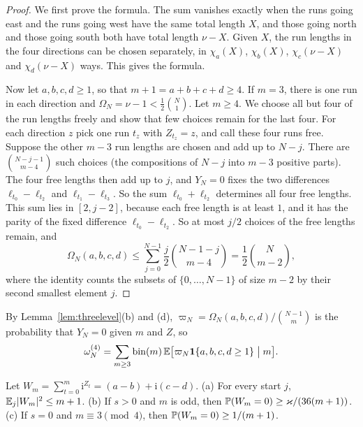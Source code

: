 \begin{proof}
We first prove the formula. The sum vanishes exactly when the runs going east and the runs going
west have the same total length $X$, and those going north and those going south both have total
length $\nu-X$. Given $X$, the run lengths in the four directions can be chosen separately, in
$\chi_a(X)$, $\chi_b(X)$, $\chi_c(\nu-X)$ and $\chi_d(\nu-X)$ ways. This gives the formula.

Now let $a,b,c,d\ge1$, so that $m+1=a+b+c+d\ge4$. If $m=3$, there is one run in each direction and
$\Omega_N=\nu-1<\frac12\binom N1$. Let $m\ge4$. We choose all but four of the run lengths freely and
show that few choices remain for the last four. For each direction $z$ pick one run $t_z$ with
$Z_{t_z}=z$, and call these four runs free. Suppose the other $m-3$ run lengths are chosen and add
up to $N-j$. There are $\binom{N-j-1}{m-4}$ such choices (the compositions of $N-j$ into $m-3$
positive parts). The four free lengths then add up to $j$, and $Y_N=0$ fixes the two differences
$\ell_{t_0}-\ell_{t_2}$ and $\ell_{t_1}-\ell_{t_3}$. So the sum $\ell_{t_0}+\ell_{t_2}$ determines
all four free lengths. This sum lies in $[2,j-2]$, because each free length is at least $1$, and it
has the parity of the fixed difference $\ell_{t_0}-\ell_{t_2}$. So at most $j/2$ choices of the free
lengths remain, and
\[
 \Omega_N(a,b,c,d)\le\sum_{j=0}^{N-1}\frac j2\binom{N-1-j}{m-4}=\frac12\binom N{m-2},
\]
where the identity counts the subsets of $\{0,\dots,N-1\}$ of size $m-2$ by their second smallest
element $j$.
\end{proof}

By Lemma~\ref{lem:threelevel}(b) and (d), $\varpi_N=\Omega_N(a,b,c,d)/\binom{N-1}m$ is the probability that
$Y_N=0$ given $m$ and $Z$, so
\begin{equation}\label{eq:app-planar-o4}
 \omega^{(4)}_N=\sum_{m\ge3}\mathrm{bin}(m)\,\mathbb{E}\bigl[\varpi_N\mathbf 1\{a,b,c,d\ge1\}\bigm|m\bigr].
\end{equation}

\begin{lemma}\label{lem:skelreturn}
Let $W_m=\sum_{t=0}^m\mathrm i^{Z_t}=(a-b)+\mathrm i(c-d)$.
\textup{(a)} For every start $j$, $\mathbb{E}_j\lvert W_m\rvert^2\le m+1$.
\textup{(b)} If $s>0$ and $m$ is odd, then $\mathbb{P}(W_m=0)\ge\varkappa/(36(m+1))$.
\textup{(c)} If $s=0$ and $m\equiv3\pmod4$, then $\mathbb{P}(W_m=0)\ge1/(m+1)$.
\end{lemma}

